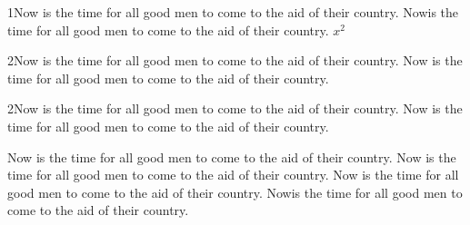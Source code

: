 \documentclass{article}
\begin{document}
1Now is the time for all good men to come to the aid of their country. Nowis the time for all good men to come to the aid of their country. $x^2$ %

2Now is the time for all good men to come to the aid of their country. Now is the time for all good men to come to the aid of their country.%

2Now is the time for all good men to come to the aid of their country. Now is the time for all good men to come to the aid of their country. %

Now is the time for all good men to come to the aid of their country. Now is the time for all good men to come to the aid of their country. Now is the time for all good men to come to the aid of their country. Nowis the time for all good men to come to the aid of their country.%
\end{document}
